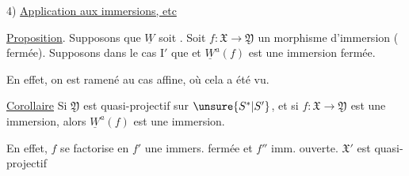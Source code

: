 4) \uline{Application aux immersions, etc}

\uline{Proposition}. Supposons que $\underline W$ soit
.
Soit $f:\mathfrak X\to\mathfrak Y$ un morphisme d'immersion
( fermée).
Supposons  
dans le cas $\mathrm I'$ que
et $\underline W^a(f)$  est une immersion fermée.

En effet, on est ramené au cas affine, où cela a été vu.

\uline{Corollaire}
Si $\mathfrak Y$ est quasi-projectif sur $\unsure{S^*|S'}$,
et si $f:\mathfrak X\to\mathfrak Y$ est une immersion,
alors $\underline W^a(f)$ est une immersion.

En effet, $f$ se factorise en
 $f'$ une immers. fermée et $f''$ imm.
ouverte. $\mathfrak X'$ est quasi-projectif 
